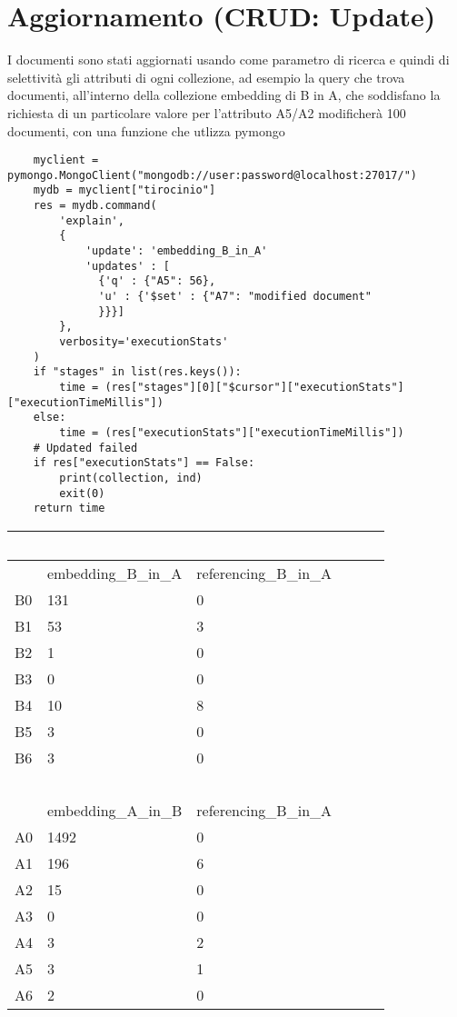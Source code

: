 \section{Aggiornamento (CRUD: Update)}

I documenti sono stati aggiornati usando come parametro di ricerca e quindi di selettività gli attributi di ogni collezione, ad esempio la query che 
trova documenti, all'interno della collezione embedding di B in A, che soddisfano la richiesta di un particolare valore per l'attributo A5/A2 
modificherà 100 documenti, con una funzione che utlizza pymongo

\begin{verbatim}
    myclient = pymongo.MongoClient("mongodb://user:password@localhost:27017/")
    mydb = myclient["tirocinio"]
    res = mydb.command(
        'explain', 
        {
            'update': 'embedding_B_in_A'
            'updates' : [
              {'q' : {"A5": 56},
              'u' : {'$set' : {"A7": "modified document"
              }}}]
        }, 
        verbosity='executionStats'
    )
    if "stages" in list(res.keys()):
        time = (res["stages"][0]["$cursor"]["executionStats"]["executionTimeMillis"])
    else:
        time = (res["executionStats"]["executionTimeMillis"])
    # Updated failed
    if res["executionStats"] == False:
        print(collection, ind)
        exit(0)
    return time 
\end{verbatim}

\begin{table}[!ht]
    \centering
    \begin{tabular}{|l|l|l|l|l|}
    \hline
        ~ & ~ & ~ & ~ & ~ \\ \hline
        ~ & embedding\_B\_in\_A & referencing\_B\_in\_A & ~ & ~ \\ \hline
        B0 & 131 & 0 & ~ & ~ \\ \hline
        B1 & 53 & 3 & ~ & ~ \\ \hline
        B2 & 1 & 0 & ~ & ~ \\ \hline
        B3 & 0 & 0 & ~ & ~ \\ \hline
        B4 & 10 & 8 & ~ & ~ \\ \hline
        B5 & 3 & 0 & ~ & ~ \\ \hline
        B6 & 3 & 0 & ~ & ~ \\ \hline
        ~ & ~ & ~ & ~ & ~ \\ \hline
        ~ & embedding\_A\_in\_B & referencing\_B\_in\_A & ~ & ~ \\ \hline
        A0 & 1492 & 0 & ~ & ~ \\ \hline
        A1 & 196 & 6 & ~ & ~ \\ \hline
        A2 & 15 & 0 & ~ & ~ \\ \hline
        A3 & 0 & 0 & ~ & ~ \\ \hline
        A4 & 3 & 2 & ~ & ~ \\ \hline
        A5 & 3 & 1 & ~ & ~ \\ \hline
        A6 & 2 & 0 & ~ & ~ \\ \hline
    \end{tabular}
    \label{upd:mongo}
\end{table}

